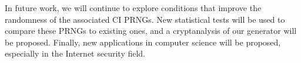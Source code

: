 \documentclass[conference]{IEEEtran}
\begin{document}
In future work, we will continue to explore conditions that improve the randomness of the associated CI PRNGs. New statistical tests will be used to compare these PRNGs to existing ones, and a cryptanalysis of our generator will be proposed. 
Finally, new applications in computer science will be proposed, especially in the Internet security field.



\end{document}
